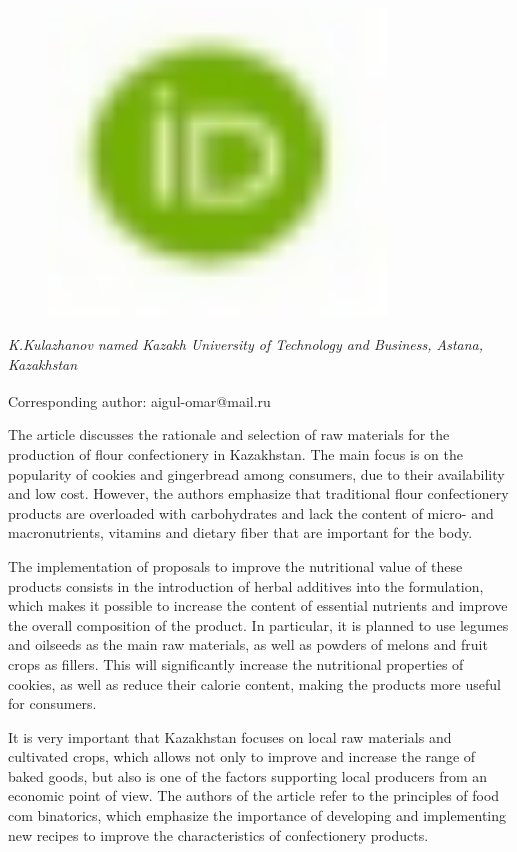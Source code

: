 \begin{figure}[H]
	\centering
	\includegraphics[width=0.8\textwidth]{media/pish2/image2}
	\caption*{}
\end{figure}


\emph{K.Kulazhanov named Kazakh University of Technology and Business,
Astana, Kazakhstan}

{\bfseries \textsuperscript{\envelope }}Corresponding author: aigul-omar@mail.ru

The article discusses the rationale and selection of raw materials for
the production of flour confectionery in Kazakhstan. The main focus is
on the popularity of cookies and gingerbread among consumers, due to
their availability and low cost. However, the authors emphasize that
traditional flour confectionery products are overloaded with
carbohydrates and lack the content of micro- and macronutrients,
vitamins and dietary fiber that are important for the body.

The implementation of proposals to improve the nutritional value of
these products consists in the introduction of herbal additives into the
formulation, which makes it possible to increase the content of
essential nutrients and improve the overall composition of the product.
In particular, it is planned to use legumes and oilseeds as the main raw
materials, as well as powders of melons and fruit crops as fillers. This
will significantly increase the nutritional properties of cookies, as
well as reduce their calorie content, making the products more useful
for consumers.

It is very important that Kazakhstan focuses on local raw materials and
cultivated crops, which allows not only to improve and increase the
range of baked goods, but also is one of the factors supporting local
producers from an economic point of view. The authors of the article
refer to the principles of food com binatorics, which emphasize the
importance of developing and implementing new recipes to improve the
characteristics of confectionery products.

